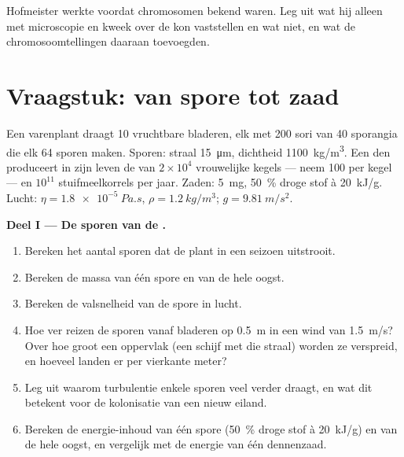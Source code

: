 \begin{exercise}[$\star\star\star$]\label{exo:b2:plant-life-cycles:12}
Hofmeister werkte voordat chromosomen bekend waren. Leg uit wat hij
alleen met microscopie en kweek over de  kon vaststellen
en wat niet, en wat de chromosoomtellingen daaraan toevoegden.
\end{exercise}

\section{Vraagstuk: van spore tot zaad}

\begin{problem}
\label{pb:b2:plant-life-cycles:1}
Een varenplant draagt \num{10} vruchtbare bladeren, elk met \num{200}
sori van \num{40} sporangia die elk \num{64} sporen maken. Sporen:
straal \qty{15}{\micro m}, dichtheid \qty{1100}{kg/m^3}. Een den
produceert in zijn leven de  van $2\times 10^{4}$ vrouwelijke
kegels --- neem \num{100}  per kegel --- en $10^{11}$
stuifmeelkorrels per jaar. Zaden: \qty{5}{mg}, \qty{50}{\%} droge stof à
\qty{20}{kJ/g}. Lucht: $\eta = \qty{1.8e-5}{Pa.s}$, $\rho =
\qty{1.2}{kg/m^3}$; $g = \qty{9.81}{m/s^2}$.

\medskip
\noindent\textbf{Deel I --- De sporen van de .}
\begin{enumerate}
  \item Bereken het aantal sporen dat de plant in een seizoen uitstrooit.
  \item Bereken de massa van één spore en van de hele oogst.
  \item Bereken de valsnelheid van de spore in lucht.
  \item Hoe ver reizen de sporen vanaf bladeren op \qty{0.5}{m} in een
        wind van \qty{1.5}{m/s}? Over hoe groot een oppervlak (een schijf
        met die straal) worden ze verspreid, en hoeveel landen er per
        vierkante meter?
  \item Leg uit waarom turbulentie enkele sporen veel verder draagt, en
        wat dit betekent voor de kolonisatie van een nieuw eiland.
  \item Bereken de energie-inhoud van één spore (\qty{50}{\%} droge stof
        à \qty{20}{kJ/g}) en van de hele oogst, en vergelijk met de energie
        van één dennenzaad.
\end{enumerate}


\end{problem}
